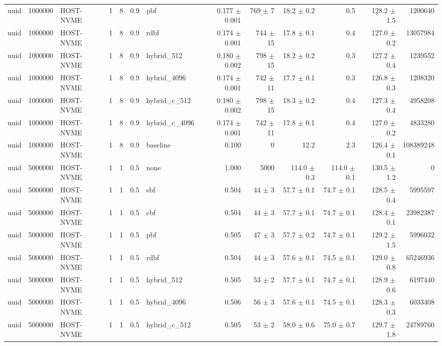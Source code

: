 \begin{tabular}{lllllllrrrrrr}
uuid & 1000000 & HOST-NVME & 1 & 8 & 0.9 & pbf & 0.177 $\pm$ 0.001 & 769 $\pm$ 7 & 18.2 $\pm$ 0.2 & 0.5 & 128.2 $\pm$ 1.5 & 1200640 \\
uuid & 1000000 & HOST-NVME & 1 & 8 & 0.9 & rdbf & 0.174 $\pm$ 0.001 & 744 $\pm$ 15 & 17.8 $\pm$ 0.1 & 0.4 & 127.0 $\pm$ 0.2 & 13057984 \\
uuid & 1000000 & HOST-NVME & 1 & 8 & 0.9 & hybrid\_512 & 0.180 $\pm$ 0.002 & 798 $\pm$ 15 & 18.2 $\pm$ 0.2 & 0.3 & 127.2 $\pm$ 0.4 & 1239552 \\
uuid & 1000000 & HOST-NVME & 1 & 8 & 0.9 & hybrid\_4096 & 0.174 $\pm$ 0.001 & 742 $\pm$ 11 & 17.7 $\pm$ 0.1 & 0.3 & 126.8 $\pm$ 0.3 & 1208320 \\
uuid & 1000000 & HOST-NVME & 1 & 8 & 0.9 & hybrid\_c\_512 & 0.180 $\pm$ 0.002 & 798 $\pm$ 15 & 18.3 $\pm$ 0.2 & 0.4 & 127.3 $\pm$ 0.4 & 4958208 \\
uuid & 1000000 & HOST-NVME & 1 & 8 & 0.9 & hybrid\_c\_4096 & 0.174 $\pm$ 0.001 & 742 $\pm$ 11 & 17.8 $\pm$ 0.1 & 0.4 & 127.0 $\pm$ 0.2 & 4833280 \\
uuid & 1000000 & HOST-NVME & 1 & 8 & 0.9 & baseline & 0.100 & 0 & 12.2 & 2.3 & 126.4 $\pm$ 0.1 & 108389248 \\
uuid & 5000000 & HOST-NVME & 1 & 1 & 0.5 & none & 1.000 & 5000 & 114.0 $\pm$ 0.3 & 114.0 $\pm$ 0.1 & 130.5 $\pm$ 1.2 & 0 \\
uuid & 5000000 & HOST-NVME & 1 & 1 & 0.5 & sbf & 0.504 & 44 $\pm$ 3 & 57.7 $\pm$ 0.1 & 74.7 $\pm$ 0.1 & 128.5 $\pm$ 0.4 & 5995597 \\
uuid & 5000000 & HOST-NVME & 1 & 1 & 0.5 & cbf & 0.504 & 44 $\pm$ 3 & 57.7 $\pm$ 0.1 & 74.7 $\pm$ 0.1 & 128.4 $\pm$ 0.1 & 23982387 \\
uuid & 5000000 & HOST-NVME & 1 & 1 & 0.5 & pbf & 0.505 & 47 $\pm$ 3 & 57.7 $\pm$ 0.2 & 74.7 $\pm$ 0.1 & 129.2 $\pm$ 1.5 & 5996032 \\
uuid & 5000000 & HOST-NVME & 1 & 1 & 0.5 & rdbf & 0.504 & 44 $\pm$ 3 & 57.6 $\pm$ 0.1 & 74.5 $\pm$ 0.1 & 129.0 $\pm$ 0.8 & 65246936 \\
uuid & 5000000 & HOST-NVME & 1 & 1 & 0.5 & hybrid\_512 & 0.505 & 53 $\pm$ 2 & 57.7 $\pm$ 0.1 & 74.7 $\pm$ 0.1 & 128.9 $\pm$ 0.6 & 6197440 \\
uuid & 5000000 & HOST-NVME & 1 & 1 & 0.5 & hybrid\_4096 & 0.506 & 56 $\pm$ 3 & 57.6 $\pm$ 0.1 & 74.5 $\pm$ 0.1 & 128.3 $\pm$ 0.3 & 6033408 \\
uuid & 5000000 & HOST-NVME & 1 & 1 & 0.5 & hybrid\_c\_512 & 0.505 & 53 $\pm$ 2 & 58.0 $\pm$ 0.6 & 75.0 $\pm$ 0.7 & 129.7 $\pm$ 1.8 & 24789760 \\

\end{tabular}
